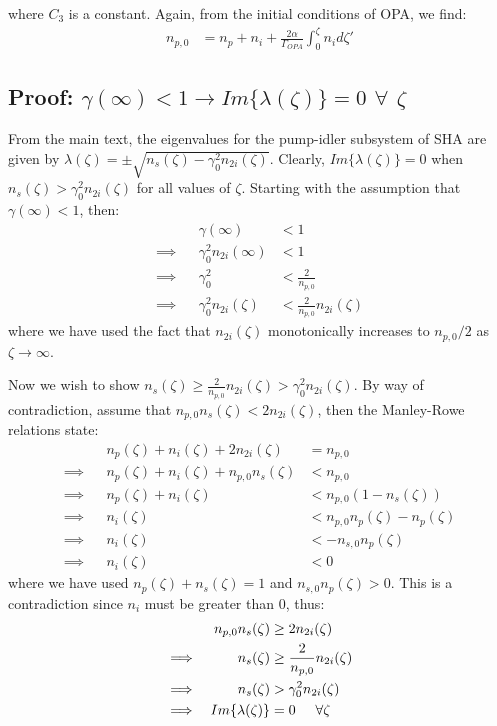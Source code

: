 \documentclass[%
 reprint,
 amsmath,amssymb,
 aps,
floatfix,
]{revtex4-2}
\begin{document}
\noindent where $C_3$ is a constant. Again, from the initial conditions of OPA, we find:
\begin{align*}
    n_{p,0} &= n_p + n_i + \frac{2\alpha}{\Gamma_{OPA}}\int^\zeta_0n_{i} d\zeta'
\end{align*}

\subsection{Proof: $\gamma(\infty)<1 \rightarrow Im \{ \lambda(\zeta) \}=0$ $\forall$ $\zeta$}

From the main text, the eigenvalues for the pump-idler subsystem of SHA are given by $\lambda(\zeta)=\pm \sqrt{n_s(\zeta) - \gamma_0^2 n_{2i}(\zeta)}$. Clearly, $Im \{ \lambda(\zeta) \}=0$ when $n_s(\zeta) > \gamma_0^2 n_{2i}(\zeta)$ for all values of $\zeta$. Starting with the assumption that $\gamma(\infty)<1$,  then:
\begin{align*}
    && \gamma(\infty) &< 1\\
    \implies && \gamma_0^2 n_{2i}(\infty)& < 1\\
    \implies && \gamma_0^2 &< \frac{2}{n_{p,0}}\\
    \implies && \gamma_0^2 n_{2i}(\zeta) &< \frac{2}{n_{p,0}} n_{2i}(\zeta) 
\end{align*}
\noindent where we have used the fact that $n_{2i}(\zeta)$ monotonically increases to $n_{p,0}/2$ as $\zeta \rightarrow \infty$. 

Now we wish to show $n_s(\zeta) \geq \frac{2}{n_{p,0}} n_{2i}(\zeta) > \gamma_0^2 n_{2i}(\zeta)$. By way of contradiction, assume that $n_{p,0} n_s(\zeta) < 2 n_{2i}(\zeta)$, then the Manley-Rowe relations state:
\begin{align*}
    && n_p(\zeta) + n_i(\zeta) + 2n_{2i}(\zeta) &= n_{p,0}\\
    \implies && n_p(\zeta) + n_i(\zeta) + n_{p,0}n_s(\zeta) &< n_{p,0}\\
    \implies && n_p(\zeta) + n_i(\zeta) &< n_{p,0} (1-n_s(\zeta))\\
    \implies && n_i(\zeta) &< n_{p,0} n_p(\zeta) - n_p(\zeta)\\
    \implies && n_i(\zeta) &< -n_{s,0} n_p(\zeta)\\
    \implies && n_i(\zeta) &< 0
\end{align*}
\noindent where we have used $n_p(\zeta)+n_s(\zeta)=1$ and $n_{s,0} n_p(\zeta) > 0$. This is a contradiction since $n_i$ must be greater than $0$, thus: 
\begin{align*}
&& n_{p,0} n_s(\zeta) &\geq 2 n_{2i}(\zeta)\\
\implies && n_s(\zeta) &\geq \frac{2}{n_{p,0}} n_{2i}(\zeta)\\
\implies && n_s(\zeta) &> \gamma_0^2 n_{2i}(\zeta)\\
\implies && Im\{ \lambda(\zeta) \} &= 0 \hspace{0.5cm} \forall \zeta
\end{align*}
\end{document}
